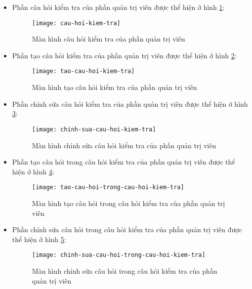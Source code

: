 \documentclass[../Thesis.tex]{subfiles}
\begin{document}
\begin{itemize}
                \item Phần câu hỏi kiểm tra của phần quản trị viên được thể hiện ở hình \ref{fig:cau-hoi-kiem-tra}:
                \begin{figure}[hbt!]
                    \centering\texttt{[image: cau-hoi-kiem-tra]}
                    \caption{Màn hình câu hỏi kiểm tra của phần quản trị viên}
                    \label{fig:cau-hoi-kiem-tra}
                \end{figure}
                \FloatBarrier

                \item Phần tạo câu hỏi kiểm tra của phần quản trị viên được thể hiện ở hình \ref{fig:tao-cau-hoi-kiem-tra}:
                \begin{figure}[hbt!]
                    \centering\texttt{[image: tao-cau-hoi-kiem-tra]}
                    \caption{Màn hình tạo câu hỏi kiểm tra của phần quản trị viên}
                    \label{fig:tao-cau-hoi-kiem-tra}
                \end{figure}
                \FloatBarrier

                \item Phần chỉnh sửa câu hỏi kiểm tra của phần quản trị viên được thể hiện ở hình \ref{fig:chinh-sua-cau-hoi-kiem-tra}:
                \begin{figure}[hbt!]
                    \centering\texttt{[image: chinh-sua-cau-hoi-kiem-tra]}
                    \caption{Màn hình chỉnh sửa câu hỏi kiểm tra của phần quản trị viên}
                    \label{fig:chinh-sua-cau-hoi-kiem-tra}
                \end{figure}
                \FloatBarrier

                \item Phần tạo câu hỏi trong câu hỏi kiểm tra của phần quản trị viên được thể hiện ở hình \ref{fig:tao-cau-hoi-trong-cau-hoi-kiem-tra}:
                \begin{figure}[hbt!]
                    \centering\texttt{[image: tao-cau-hoi-trong-cau-hoi-kiem-tra]}
                    \caption{Màn hình tạo câu hỏi trong câu hỏi kiểm tra của phần quản trị viên}
                    \label{fig:tao-cau-hoi-trong-cau-hoi-kiem-tra}
                \end{figure}
                \FloatBarrier

                \item Phần chỉnh sửa câu hỏi trong câu hỏi kiểm tra của phần quản trị viên được thể hiện ở hình \ref{fig:chinh-sua-cau-hoi-trong-cau-hoi-kiem-tra}:
                \begin{figure}[hbt!]
                    \centering\texttt{[image: chinh-sua-cau-hoi-trong-cau-hoi-kiem-tra]}
                    \caption{Màn hình chỉnh sửa câu hỏi trong câu hỏi kiểm tra của phần quản trị viên}
                    \label{fig:chinh-sua-cau-hoi-trong-cau-hoi-kiem-tra}
                \end{figure}
                \FloatBarrier


\end{itemize}
\end{document}
